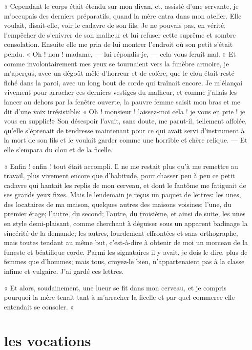 « Cependant le corps était étendu sur mon divan, et, assisté
d’une servante, je m’occupais des
derniers préparatifs, quand la mère entra dans mon atelier. Elle
voulait, disait{}-elle, voir le cadavre de son fils. Je ne pouvais pas,
en vérité, l’empêcher de s’enivrer de
son malheur et lui refuser cette suprême et sombre consolation. Ensuite
elle me pria de lui montrer l’endroit où son petit
s’était pendu. « Oh ! non ! madame, --- lui
répondis{}-je, --- cela vous ferait mal. » Et comme involontairement mes
yeux se tournaient vers la funèbre armoire, je
m’aperçus, avec un dégoût mêlé
d’horreur et de colère, que le clou était resté fiché
dans la paroi, avec un long bout de corde qui traînait encore. Je
m’élançai vivement pour arracher ces derniers vestiges
du malheur, et comme j’allais les lancer au dehors par
la fenêtre ouverte, la pauvre femme saisit mon bras et me dit
d’une voix irrésistible: « Oh ! monsieur !
laissez{}-moi cela ! je vous en prie ! je vous en supplie!» Son
désespoir l’avait, sans doute, me parut{}-il,
tellement affolée, qu’elle s’éprenait
de tendresse maintenant pour ce qui avait servi
d’instrument à la mort de son fils et le voulait
garder comme une horrible et chère relique. --- Et elle
s’empara du clou et de la ficelle.

« Enfin ! enfin ! tout était accompli. Il ne me restait plus
qu’à me remettre au travail, plus vivement encore que
d’habitude, pour chasser peu à peu ce petit cadavre
qui hantait les replis de mon cerveau, et dont le fantôme me fatiguait
de ses grands yeux fixes. Mais le lendemain je reçus un paquet de
lettres: les unes, des locataires de ma maison, quelques autres des
maisons voisines; l’une, du premier étage;
l’autre, du second; l’autre, du
troisième, et ainsi de suite, les unes en style demi{}-plaisant, comme
cherchant à déguiser sous un apparent badinage la sincérité de la
demande; les autres, lourdement effrontées et sans orthographe, mais
toutes tendant au même but, c’est{}-à{}-dire à obtenir
de moi un morceau de la funeste et béatifique corde. Parmi les
signataires il y avait, je dois le dire, plus de femmes que
d’hommes; mais tous, croyez{}-le bien,
n’appartenaient pas à la classe infime et vulgaire.
J’ai gardé ces lettres.

« Et alors, soudainement, une lueur se fit dans mon cerveau, et je
compris pourquoi la mère tenait tant à m’arracher la
ficelle et par quel commerce elle entendait se consoler. »

\quebra\section[Les vocations]{les vocations }

